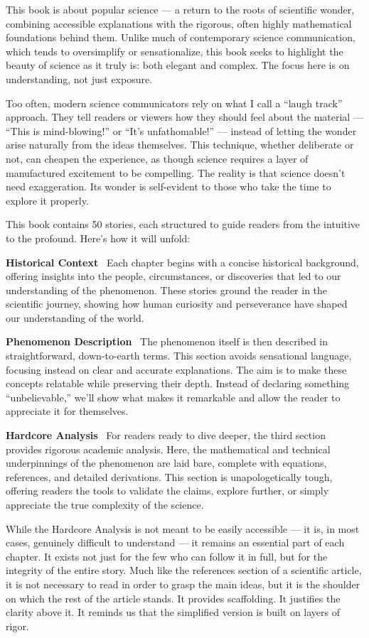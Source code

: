 This book is about popular science — a return to the roots of scientific wonder, combining accessible explanations with the rigorous, often highly mathematical foundations behind them. Unlike much of contemporary science communication, which tends to oversimplify or sensationalize, this book seeks to highlight the beauty of science as it truly is: both elegant and complex. The focus here is on understanding, not just exposure.

Too often, modern science communicators rely on what I call a “laugh track” approach. They tell readers or viewers how they should feel about the material — “This is mind-blowing!” or “It’s unfathomable!” — instead of letting the wonder arise naturally from the ideas themselves. This technique, whether deliberate or not, can cheapen the experience, as though science requires a layer of manufactured excitement to be compelling. The reality is that science doesn’t need exaggeration. Its wonder is self-evident to those who take the time to explore it properly.

This book contains 50 stories, each structured to guide readers from the intuitive to the profound. Here’s how it will unfold:

\textbf{Historical Context} \ Each chapter begins with a concise historical background, offering insights into the people, circumstances, or discoveries that led to our understanding of the phenomenon. These stories ground the reader in the scientific journey, showing how human curiosity and perseverance have shaped our understanding of the world.

\textbf{Phenomenon Description} \ The phenomenon itself is then described in straightforward, down-to-earth terms. This section avoids sensational language, focusing instead on clear and accurate explanations. The aim is to make these concepts relatable while preserving their depth. Instead of declaring something “unbelievable,” we’ll show what makes it remarkable and allow the reader to appreciate it for themselves.

\textbf{Hardcore Analysis} \ For readers ready to dive deeper, the third section provides rigorous academic analysis. Here, the mathematical and technical underpinnings of the phenomenon are laid bare, complete with equations, references, and detailed derivations. This section is unapologetically tough, offering readers the tools to validate the claims, explore further, or simply appreciate the true complexity of the science.

While the Hardcore Analysis is not meant to be easily accessible — it is, in most cases, genuinely difficult to understand — it remains an essential part of each chapter. It exists not just for the few who can follow it in full, but for the integrity of the entire story. Much like the references section of a scientific article, it is not necessary to read in order to grasp the main ideas, but it is the shoulder on which the rest of the article stands. It provides scaffolding. It justifies the clarity above it. It reminds us that the simplified version is built on layers of rigor.

